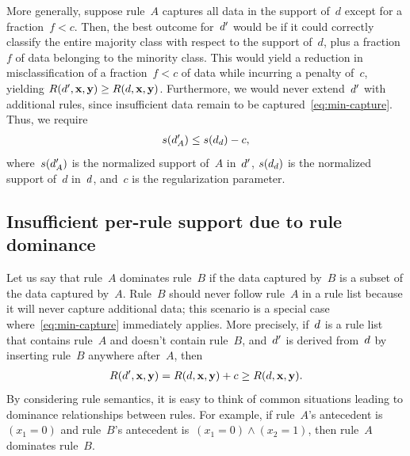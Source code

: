 More generally, suppose rule~$A$ captures all data in the support of~$d$
except for a fraction~${f < c}$.
%
Then, the best outcome for~${d}'$ would be if it could correctly classify
the entire majority class with respect to the support of~$d$,
plus a fraction~$f$ of data belonging to the minority class.
%
This would yield a reduction in misclassification of a fraction~${f < c}$
of data while incurring a penalty of~$c$, yielding
${R({d}', \mathbf{x}, \mathbf{y}) \ge R({d}, \mathbf{x}, \mathbf{y})}$.
%
Furthermore, we would never extend~${d}'$ with additional rules,
since insufficient data remain to be captured~\eqref{eq:min-capture}.
%
Thus, we require
\begin{align}
s(\RL'_A) \le s(\RL_d) - c,
\label{eq:max-capture}
\end{align}
where~$s({d}'_A)$ is the normalized support of~$A$ in~${d}'$,
$s({d}_d)$ is the normalized support of~$d$ in~${d}$,
and~$c$ is the regularization parameter.

\subsection{Insufficient per-rule support due to rule dominance}

Let us say that rule~$A$ dominates rule~$B$ if the data captured by~$B$ is a subset of the data captured by~$A$.
%
Rule~$B$ should never follow rule~$A$ in a rule list because it will never capture additional data;
this scenario is a special case where~\eqref{eq:min-capture} immediately applies.
%
More precisely, if~${d}$ is a rule list that contains rule~$A$ and doesn't contain rule~$B$,
and~${d}'$ is derived from~${d}$ by inserting rule~$B$ anywhere after~$A$, then
\begin{align}
\Obj(\RL', \x, \y) = \Obj(\RL, \x, \y) + c \ge \Obj(\RL, \x, \y).
\end{align}
By considering rule semantics, it is easy to think of common situations
leading to dominance relationships between rules.
%
For example, if rule~$A$'s antecedent is~${(x_1 = 0)}$ and rule~$B$'s
antecedent is~${(x_1 = 0) \wedge (x_2 = 1)}$, then rule~$A$ dominates rule~$B$.
%

